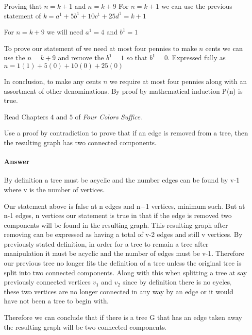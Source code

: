 \documentclass{article}
\begin{document}
{Proving that $n = k+1$ and $n =k+9$
For $n = k+1$ we can use the previous statement of $k = a^1+5b^1+10c^1+25d^1 = k+1$

For $n = k+9$ we will need $a^1=4$ and $b^1=1$

To prove our statement of we need at most four pennies to make $n$ cents we can
use the $n = k+9$ and remove the $b^1=1$ so that $b^1=0$. Expressed fully as
$n = 1(1)+5(0)+10(0)+25(0)$

In conclusion, to make any cents $n$ we require at most four pennies along with
an assortment of other denominations.
By proof by mathematical induction P(n) is true.


 

Read Chapters $4$ and $5$ of \emph{Four Colors Suffice}.

Use a proof by contradiction to prove that if an edge is removed from a
tree, then the resulting graph has two connected components.

\paragraph{Answer}
By definition a tree must be acyclic and the number edges can be found by v-1
where v is the number of vertices.

Our statement above is false at n edges and n+1 vertices, minimum such. But at
n-1 edges, n vertices our statement is true in that if the edge is removed two components will
be found in the resulting graph. This resulting graph after removing can be
expressed as having a total of v-2 edges and still v vertices. By previously
stated definition, in order for a tree to remain a tree after manipulation it must
be acyclic and the number of edges must be v-1. Therefore our previous tree no
longer fits the definition of a tree unless the original tree is split into two
connected components. Along with this when splitting a tree at say previously
connected vertices $v_1$ and $v_2$ since by definition there is no cycles, these
two vertices are no longer connected in any way by an edge or it would have not
been a tree to begin with.

Therefore we can conclude that if there is a tree G that has an edge taken away
the resulting graph will be two connected components.

}
\end{document}

